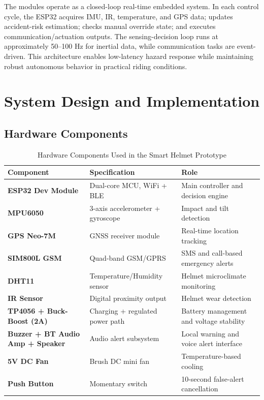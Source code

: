 \documentclass[10pt,a4paper]{article}
\begin{document}
The modules operate as a closed-loop real-time embedded system. In each control cycle, the ESP32 acquires IMU, IR, temperature, and GPS data; updates accident-risk estimation; checks manual override state; and executes communication/actuation outputs. The sensing-decision loop runs at approximately 50--100 Hz for inertial data, while communication tasks are event-driven. This architecture enables low-latency hazard response while maintaining robust autonomous behavior in practical riding conditions.

\section{System Design and Implementation}

\subsection{Hardware Components}

\begin{table}[H]
\centering
\renewcommand{\arraystretch}{1.4}
\begin{tabular}{|>{\bfseries}l|l|l|}
  \hline
  \rowcolor{accentblue!12}
  Component & Specification & Role \\
  \hline
  ESP32 Dev Module & Dual-core MCU, WiFi + BLE & Main controller and decision engine \\
  MPU6050 & 3-axis accelerometer + gyroscope & Impact and tilt detection \\
  GPS Neo-7M & GNSS receiver module & Real-time location tracking \\
  SIM800L GSM & Quad-band GSM/GPRS & SMS and call-based emergency alerts \\
  DHT11 & Temperature/Humidity sensor & Helmet microclimate monitoring \\
  IR Sensor & Digital proximity output & Helmet wear detection \\
  TP4056 + Buck-Boost (2A) & Charging + regulated power path & Battery management and voltage stability \\
  Buzzer + BT Audio Amp + Speaker & Audio alert subsystem & Local warning and voice alert interface \\
  5V DC Fan & Brush DC mini fan & Temperature-based cooling \\
  Push Button & Momentary switch & 10-second false-alert cancellation \\
  \hline
\end{tabular}
\caption{Hardware Components Used in the Smart Helmet Prototype}
\end{table}
\end{document}
